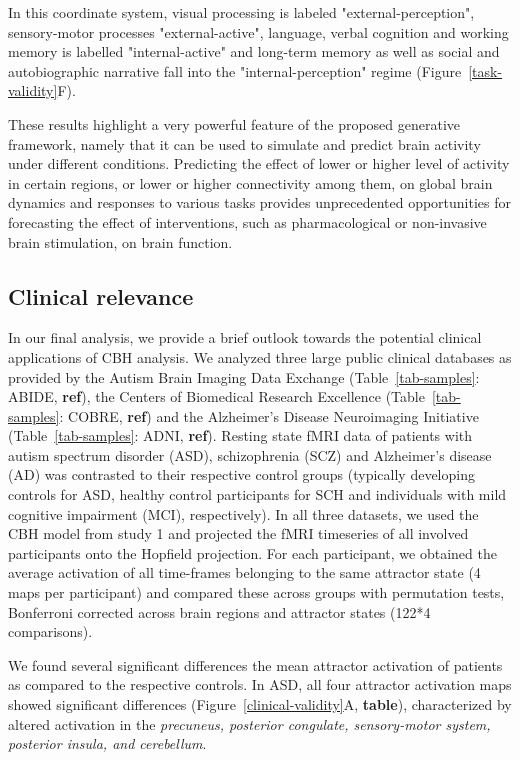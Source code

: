 \documentclass{article}
\begin{document}
In this coordinate system, visual processing is labeled "external-perception", sensory-motor processes "external-active", language, verbal cognition and working memory is labelled "internal-active" and long-term memory as well as social and autobiographic narrative fall into the "internal-perception" regime (Figure~\ref{task-validity}F).

These results highlight a very powerful feature of the proposed generative framework, namely that it can be used to simulate and predict brain activity under different conditions. Predicting the effect of lower or higher level of activity in certain regions, or lower or higher connectivity among them, on global brain dynamics and responses to various tasks provides unprecedented opportunities for forecasting the effect of interventions, such as pharmacological or non-invasive brain stimulation, on brain function.

\subsection{Clinical relevance}\label{Clinical relevance}

In our final analysis, we provide a brief outlook towards the potential clinical applications of CBH analysis. We analyzed three large public clinical databases as provided by the Autism Brain Imaging Data Exchange (Table~\ref{tab-samples}: ABIDE, \textbf{ref}), the Centers of Biomedical Research Excellence (Table~\ref{tab-samples}: COBRE, \textbf{ref}) and the Alzheimer's Disease Neuroimaging Initiative (Table~\ref{tab-samples}: ADNI, \textbf{ref}).
Resting state fMRI data of patients with autism spectrum disorder (ASD), schizophrenia (SCZ) and Alzheimer's disease (AD) was contrasted to their respective control groups (typically developing controls for ASD, healthy control participants for SCH and individuals with mild cognitive impairment (MCI), respectively).
In all three datasets, we used the CBH model from study 1 and projected the fMRI timeseries of all involved participants onto the Hopfield projection. For each participant, we obtained the average activation of all time-frames belonging to the same attractor state (4 maps per participant) and compared these across groups with permutation tests, Bonferroni corrected across brain regions and attractor states (122*4 comparisons).

We found several significant differences the mean attractor activation of patients as compared to the respective controls. In ASD, all four attractor activation maps showed significant differences (Figure~\ref{clinical-validity}A, \textbf{table}), characterized by altered activation in the \textit{precuneus, posterior congulate, sensory-motor system, posterior insula, and cerebellum}.
\end{document}
